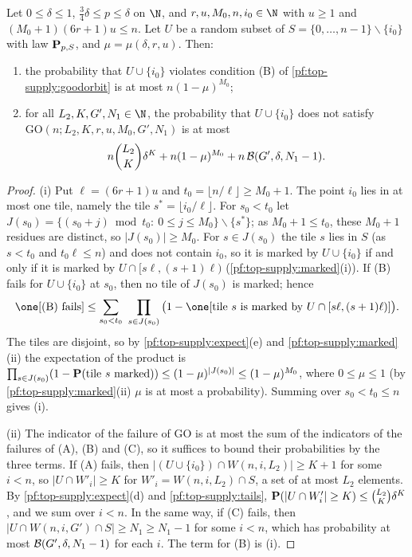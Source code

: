 \begin{lemma}\label{pf:top-supply:notgood}
Let $0\le\delta\le1$, $\frac34\delta\le p\le\delta$ on $\N$, and $r,u,M_0,n,i_0\in\N$ with $u\ge1$ and
$(M_0+1)(6r+1)u\le n$. Let $U$ be a random subset of $S=\{0,\dots,n-1\}\smallsetminus\{i_0\}$ with law
$\mathbf{P}_{p,S}$, and $\mu=\mu(\delta,r,u)$. Then:
\begin{enumerate}[label=(\roman*)]
\item the probability that $U\cup\{i_0\}$ violates condition (B) of \cref{pf:top-supply:goodorbit} is at most $n(1-\mu)^{M_0}$;
\item for all $L_2,K,G',N_1\in\N$, the probability that $U\cup\{i_0\}$ does not satisfy $\mathrm{GO}(n;L_2,K,r,u,M_0,G',N_1)$
is at most
\[
n\binom{L_2}K\delta^K+n(1-\mu)^{M_0}+n\,\mathcal{B}(G',\delta,N_1-1).
\]
\end{enumerate}
 
\end{lemma}

\begin{proof}
(i) Put $\ell=(6r+1)u$ and $t_0=\lfloor n/\ell\rfloor\ge M_0+1$. The point $i_0$ lies in at most one tile, namely the tile
$s^*=\lfloor i_0/\ell\rfloor$. For $s_0<t_0$ let $J(s_0)=\{(s_0+j)\bmod t_0:\ 0\le j\le M_0\}\smallsetminus\{s^*\}$; as
$M_0+1\le t_0$, these $M_0+1$ residues are distinct, so $|J(s_0)|\ge M_0$. For $s\in J(s_0)$ the tile $s$ lies in $S$ (as
$s<t_0$ and $t_0\ell\le n$) and does not contain $i_0$, so it is marked by $U\cup\{i_0\}$ if and only if it is marked by
$U\cap[s\ell,(s+1)\ell)$ (\cref{pf:top-supply:marked}(i)). If (B) fails for $U\cup\{i_0\}$ at $s_0$, then no tile of
$J(s_0)$ is marked; hence
\[
\one[\text{(B) fails}]\le\sum_{s_0<t_0}\ \prod_{s\in J(s_0)}\big(1-\one[\text{tile }s\text{ is marked by }U\cap[s\ell,(s+1)\ell)]\big).
\]
The tiles are disjoint, so by \cref{pf:top-supply:expect}(e) and \cref{pf:top-supply:marked}(ii) the expectation of the
product is $\prod_{s\in J(s_0)}(1-\mathbf{P}(\text{tile }s\text{ marked}))\le(1-\mu)^{|J(s_0)|}\le(1-\mu)^{M_0}$, where
$0\le\mu\le1$ (by \cref{pf:top-supply:marked}(ii) $\mu$ is at most a probability). Summing over $s_0<t_0\le n$ gives (i).

(ii) The indicator of the failure of $\mathrm{GO}$ is at most the sum of the indicators of the failures of (A), (B) and (C),
so it suffices to bound their probabilities by the three terms. If (A) fails, then $|(U\cup\{i_0\})\cap W(n,i,L_2)|\ge K+1$ for
some $i<n$, so $|U\cap W'_i|\ge K$ for $W'_i=W(n,i,L_2)\cap S$, a set of at most $L_2$ elements. By
\cref{pf:top-supply:expect}(d) and \cref{pf:top-supply:tails}, $\mathbf{P}(|U\cap W'_i|\ge K)\le\binom{L_2}K\delta^K$, and
we sum over $i<n$. In the same way, if (C) fails, then $|U\cap W(n,i,G')\cap S|\ge N_1\ge N_1-1$ for some $i<n$, which has
probability at most $\mathcal{B}(G',\delta,N_1-1)$ for each $i$. The term for (B) is (i).
\end{proof}

